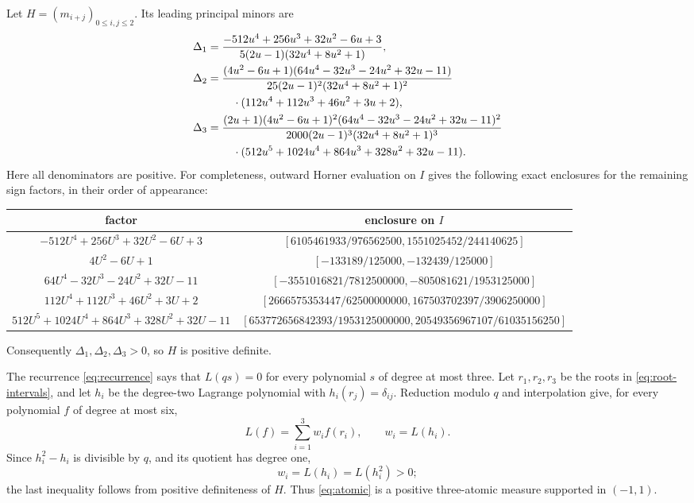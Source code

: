\documentclass[11pt]{article}
\begin{document}
Let $H=(m_{i+j})_{0\leq i,j\leq2}$.  Its leading principal minors are
\begin{align}
\Delta_1={}&\frac{-512u^4+256u^3+32u^2-6u+3}
 {5(2u-1)(32u^4+8u^2+1)},\label{eq:d1}\\
\Delta_2={}&\frac{(4u^2-6u+1)
 (64u^4-32u^3-24u^2+32u-11)}
 {25(2u-1)^2(32u^4+8u^2+1)^2}\notag\\
&\quad\cdot(112u^4+112u^3+46u^2+3u+2),\label{eq:d2}\\
\Delta_3={}&\frac{(2u+1)(4u^2-6u+1)^2
 (64u^4-32u^3-24u^2+32u-11)^2}
 {2000(2u-1)^3(32u^4+8u^2+1)^3}\notag\\
&\quad\cdot(512u^5+1024u^4+864u^3+328u^2+32u-11).
\label{eq:d3}
\end{align}
Here all denominators are positive.  For completeness, outward Horner
evaluation on $I$ gives the following exact enclosures for the remaining
sign factors, in their order of appearance:
\newpage
\begin{center}
\footnotesize
\begin{tabular}{c@{\enspace}c}
\toprule
factor & enclosure on $I$\\
\midrule
$-512U^4+256U^3+32U^2-6U+3$
 & $[6105461933/976562500,1551025452/244140625]$\\
$4U^2-6U+1$
 & $[-133189/125000,-132439/125000]$\\
$64U^4-32U^3-24U^2+32U-11$
 & $[-3551016821/7812500000,-805081621/1953125000]$\\
$112U^4+112U^3+46U^2+3U+2$
 & $[2666575353447/62500000000,167503702397/3906250000]$\\
$512U^5+1024U^4+864U^3+328U^2+32U-11$
 & $[653772656842393/1953125000000,20549356967107/61035156250]$\\
\bottomrule
\end{tabular}
\end{center}
Consequently $\Delta_1,\Delta_2,\Delta_3>0$, so $H$ is positive definite.

The recurrence \eqref{eq:recurrence} says that
$L(qs)=0$ for every polynomial $s$ of degree at most three.  Let
$r_1,r_2,r_3$ be the roots in \eqref{eq:root-intervals}, and let $h_i$ be
the degree-two Lagrange polynomial with $h_i(r_j)=\delta_{ij}$.  Reduction
modulo $q$ and interpolation give, for every polynomial $f$ of degree at
most six,
\begin{equation}\label{eq:atomic}
 L(f)=\sum_{i=1}^3w_i f(r_i),\qquad w_i=L(h_i).
\end{equation}
Since $h_i^2-h_i$ is divisible by $q$, and its quotient has degree one,
\[
 w_i=L(h_i)=L(h_i^2)>0;
\]
the last inequality follows from positive definiteness of $H$.  Thus
\eqref{eq:atomic} is a positive three-atomic measure supported in $(-1,1)$.
\end{document}

